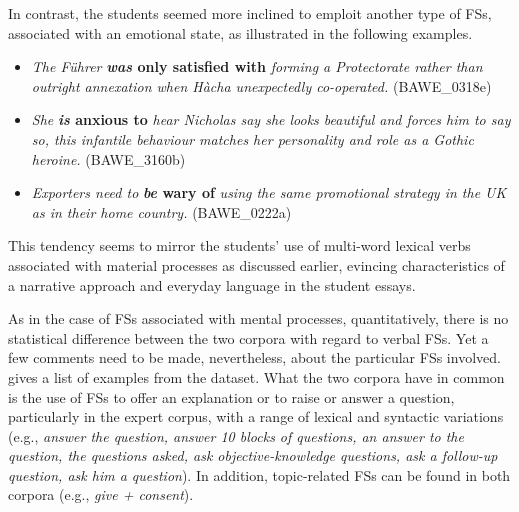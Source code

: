 In contrast, the students seemed more inclined to emploit another type of FSs, associated with an emotional state, as illustrated in the following examples. 

\begin{itemize}
\item \begin{styleListParagraph}
\textit{The Führer} \textbf{\textit{was} \textbf{only} \textbf{satisfied} \textbf{with}} \textit{forming a Protectorate rather than outright annexation when Hàcha unexpectedly co-operated.} (BAWE\_0318e)
\end{styleListParagraph}
\item \begin{styleListParagraph}
\textit{She} \textbf{\textit{is} \textbf{anxious} \textbf{to}} \textit{hear Nicholas say she looks beautiful and forces him to say so, this infantile behaviour matches her personality and role as a Gothic heroine.} (BAWE\_3160b)
\end{styleListParagraph}
\item \begin{styleListParagraph}
\textit{Exporters need to} \textbf{\textit{be} \textbf{wary} \textbf{of}} \textit{using the same promotional strategy in the UK as in their home country.} (BAWE\_0222a)
\end{styleListParagraph}
\end{itemize}

This tendency seems to mirror the students’ use of multi-word lexical verbs associated with material processes as discussed earlier, evincing characteristics of a narrative approach and everyday language in the student essays.

As in the case of FSs associated with mental processes, quantitatively, there is no statistical difference between the two corpora with regard to verbal FSs. Yet a few comments need to be made, nevertheless, about the particular FSs involved.  gives a list of examples from the dataset. What the two corpora have in common is the use of FSs to offer an explanation or to raise or answer a question, particularly in the expert corpus, with a range of lexical and syntactic variations (e.g., \textit{answer the question, answer 10 blocks of questions, an answer to the question, the questions asked, ask objective-knowledge questions, ask a follow-up question, ask him a question}). In addition, topic-related FSs can be found in both corpora (e.g., \textit{give + consent}). 


